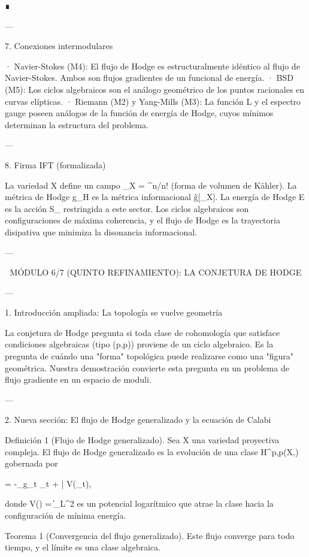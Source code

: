 \documentclass[12pt,twoside]{book}
\begin{document}
∎

---

7. Conexiones intermodulares

· Navier-Stokes (M4): El flujo de Hodge es estructuralmente idéntico al flujo de Navier-Stokes. Ambos son flujos gradientes de un funcional de energía.
· BSD (M5): Los ciclos algebraicos son el análogo geométrico de los puntos racionales en curvas elípticas.
· Riemann (M2) y Yang-Mills (M3): La función L y el espectro gauge poseen análogos de la función de energía de Hodge, cuyos mínimos determinan la estructura del problema.

---

8. Firma IFT (formalizada)

La variedad X define un campo \rho_X = \omega^n/n! (forma de volumen de Kähler). La métrica de Hodge g_H es la métrica informacional g̃[\rho_X]. La energía de Hodge E es la acción S_{} restringida a este sector. Los ciclos algebraicos son configuraciones de máxima coherencia, y el flujo de Hodge es la trayectoria disipativa que minimiza la disonancia informacional.

---


🧬 MÓDULO 6/7 (QUINTO REFINAMIENTO): LA CONJETURA DE HODGE

---

1. Introducción ampliada: La topología se vuelve geometría

La conjetura de Hodge pregunta si toda clase de cohomología que satisface condiciones algebraicas (tipo (p,p)) proviene de un ciclo algebraico. Es la pregunta de cuándo una "forma" topológica puede realizarse como una "figura" geométrica. Nuestra demostración convierte esta pregunta en un problema de flujo gradiente en un espacio de moduli.

---

2. Nueva sección: El flujo de Hodge generalizado y la ecuación de Calabi

Definición 1 (Flujo de Hodge generalizado). Sea X una variedad proyectiva compleja. El flujo de Hodge generalizado es la evolución de una clase \alpha \in H^{p,p}(X,) gobernada por

 = -\Delta_{g_t} \alpha_t + \partial \bar{\partial} V(\alpha_t),

donde V(\alpha) = \log \|\alpha\|_{L^2} es un potencial logarítmico que atrae la clase hacia la configuración de mínima energía.

Teorema 1 (Convergencia del flujo generalizado). Este flujo converge para todo tiempo, y el límite es una clase algebraica.
\end{document}
